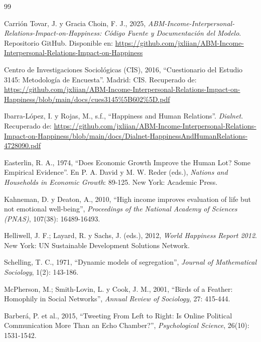 \documentclass[a4paper,12pt]{article}
\begin{document}
\begin{thebibliography}{99}

Carrión Tovar, J. y Gracia Choin, F. J., 2025, \textit{ABM-Income-Interpersonal-Relations-Impact-on-Happiness: Código Fuente y Documentación del Modelo}. Repositorio GitHub. Disponible en: \url{https://github.com/jxliian/ABM-Income-Interpersonal-Relations-Impact-on-Happiness}

Centro de Investigaciones Sociológicas (CIS), 2016, “Cuestionario del Estudio 3145: Metodología de Encuesta”. Madrid: CIS. Recuperado de: \url{https://github.com/jxliian/ABM-Income-Interpersonal-Relations-Impact-on-Happiness/blob/main/docs/cues3145%5B602%5D.pdf}

Ibarra-López, I. y Rojas, M., s.f., “Happiness and Human Relations”. \textit{Dialnet}. Recuperado de: \url{https://github.com/jxliian/ABM-Income-Interpersonal-Relations-Impact-on-Happiness/blob/main/docs/Dialnet-HappinessAndHumanRelations-4728090.pdf}

Easterlin, R. A., 1974, “Does Economic Growth Improve the Human Lot? Some Empirical Evidence”. En P. A. David y M. W. Reder (eds.), \textit{Nations and Households in Economic Growth}: 89-125. New York: Academic Press.

Kahneman, D. y Deaton, A., 2010, “High income improves evaluation of life but not emotional well-being”, \textit{Proceedings of the National Academy of Sciences (PNAS)}, 107(38): 16489-16493.

Helliwell, J. F.; Layard, R. y Sachs, J. (eds.), 2012, \textit{World Happiness Report 2012}. New York: UN Sustainable Development Solutions Network.

Schelling, T. C., 1971, “Dynamic models of segregation”, \textit{Journal of Mathematical Sociology}, 1(2): 143-186.

McPherson, M.; Smith-Lovin, L. y Cook, J. M., 2001, “Birds of a Feather: Homophily in Social Networks”, \textit{Annual Review of Sociology}, 27: 415-444.

Barberá, P. et al., 2015, “Tweeting From Left to Right: Is Online Political Communication More Than an Echo Chamber?”, \textit{Psychological Science}, 26(10): 1531-1542.


\end{thebibliography}
\end{document}
